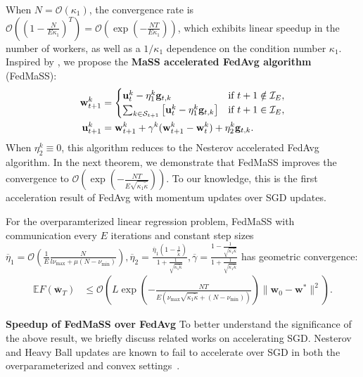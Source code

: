 When $N=\mathcal{O}(\kappa_{1})$, the convergence rate is $\mathcal{O}((1-\frac{N}{E\kappa_{1}})^{T})=\mathcal{O}(\exp(-\frac{NT}{E\kappa_{1}}))$,
which exhibits linear speedup in the number of workers, as well as
a $1/\kappa_{1}$ dependence on the condition number $\kappa_{1}$.
Inspired by \cite{liu2018accelerating}, we propose the \textbf{MaSS
	accelerated FedAvg algorithm} (FedMaSS):
\begin{align*}
\mathbf{w}_{t+1}^{k} & =\begin{cases}
\mathbf{u}_{t}^{k}-\eta_{1}^{k}\mathbf{g}_{t,k} & \text{if }t+1\notin\mathcal{I}_{E},\\
\sum_{k \in {\mathcal{S}}_{t+1}}\left[\mathbf{u}_{t}^{k}-\eta_{1}^{k}\mathbf{g}_{t,k}\right] & \text{if }t+1\in\mathcal{I}_{E},
\end{cases}\\
\mathbf{u}_{t+1}^{k} & =\mathbf{w}_{t+1}^{k}+\gamma^{k}(\mathbf{w}_{t+1}^{k}-\mathbf{w}_{t}^{k})+\eta_{2}^{k}\mathbf{g}_{t,k}. 
\end{align*}
When $\eta_{2}^{k}\equiv0$, this algorithm reduces to the Nesterov
accelerated FedAvg algorithm. In the next theorem, we demonstrate
that FedMaSS improves the convergence to $\mathcal{O}(\exp(-\frac{NT}{E\sqrt{\kappa_{1}\tilde{\kappa}}}))$.
To our knowledge, this is the first acceleration result of
FedAvg with momentum updates over SGD updates.
\begin{theorem}
	\label{thm:overparameterized_MaSS}For the overparamterized linear regression problem, FedMaSS with communication every $E$ iterations and constant
	step sizes $\overline{\eta}_1=\mathcal{O}(\frac{1}{E}\frac{N}{l\nu_{\max}+\mu(N-\nu_{\min})}),\overline{\eta}_{2}=\frac{\overline{\eta}_{1}(1-\frac{1}{\tilde{\kappa}})}{1+\frac{1}{\sqrt{\kappa_{1}\tilde{\kappa}}}},\overline{\gamma}=\frac{1-\frac{1}{\sqrt{\kappa_{1}\tilde{\kappa}}}}{1+\frac{1}{\sqrt{\kappa_{1}\tilde{\kappa}}}}$
	has geometric convergence:
	\begin{align*}
	\mathbb{E}F(\overline{\mathbf{w}}_{T}) & \leq\mathcal{O}\left(L\exp(-\frac{NT}{E(\nu_{\max}\sqrt{\kappa_{1}\tilde{\kappa}}+(N-\nu_{\min}))})\|\mathbf{w}_{0}-\mathbf{w}^{\ast}\|^{2}\right).
	\end{align*}
\end{theorem}
\textbf{Speedup of FedMaSS over FedAvg} 
To better understand the significance of the above result, we briefly discuss related works on accelerating SGD.
Nesterov and Heavy Ball updates are known to fail to accelerate over SGD in both the overparameterized
and convex settings~\cite{liu2018accelerating,kidambi2018insufficiency,liu2018toward,yuan2016influence}.
